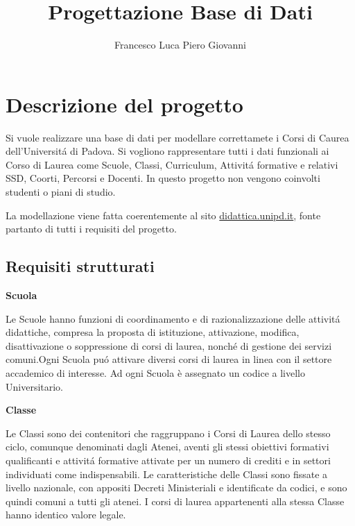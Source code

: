 \documentclass[a4paper,12pt,italian,towside]{article}
\title{Progettazione Base di Dati}
\author{Francesco Luca Piero Giovanni}
\date{}
\begin{document}
\maketitle
\newpage

\tableofcontents

\newpage
\section{Descrizione del progetto}
Si vuole realizzare una base di dati per modellare correttamete i Corsi di Caurea dell'Universit\'a di Padova.
Si vogliono rappresentare tutti i dati funzionali ai Corso di Laurea come Scuole, Classi, Curriculum, Attivit\'a formative e relativi SSD, Coorti, Percorsi e Docenti.
In questo progetto non vengono coinvolti studenti o piani di studio.
\par
La modellazione viene fatta coerentemente al sito  \href{https://didattica.unipd.it/}{didattica.unipd.it}, fonte partanto di tutti i requisiti del progetto.



\subsection{Requisiti strutturati}

\textbf{Scuola}
\par Le Scuole hanno funzioni di coordinamento e di razionalizzazione delle attivit\'a didattiche, compresa la proposta di istituzione, attivazione, modifica, disattivazione o soppressione di corsi di laurea, nonch\'e di gestione dei servizi comuni.\textcolor{red!50}{Ogni Scuola pu\'o attivare diversi corsi di laurea in linea con il settore accademico di interesse. Ad ogni Scuola è assegnato un codice a livello Universitario.}
\newline

\textbf{Classe}
\par
\textcolor{red!50}{Le Classi sono dei contenitori che raggruppano i Corsi di Laurea dello stesso ciclo, comunque denominati dagli Atenei, aventi gli stessi obiettivi formativi qualificanti e attivit\'a formative attivate per un numero di crediti e in settori individuati come indispensabili. Le caratteristiche delle Classi sono fissate a livello nazionale, con appositi Decreti Ministeriali e identificate da codici, e sono quindi comuni a tutti gli atenei. I corsi di laurea appartenenti alla stessa Classe hanno identico valore legale.}
\\
\end{document}
